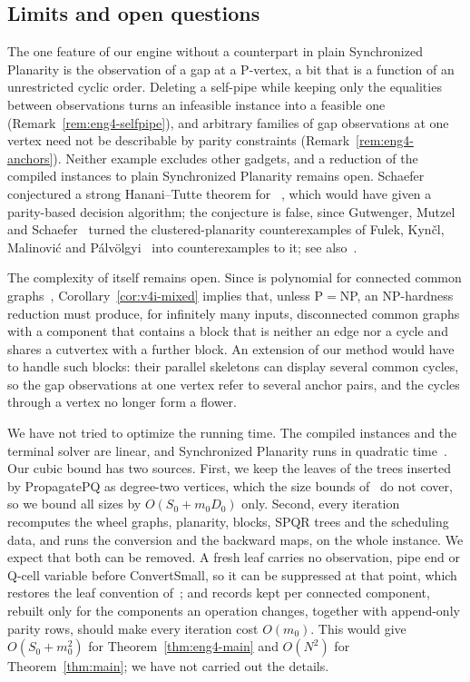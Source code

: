 \subsection{Limits and open questions}
The one feature of our engine without a counterpart in plain Synchronized
Planarity is the observation of a gap at a P-vertex, a bit that is a
function of an unrestricted cyclic order. Deleting a self-pipe while keeping
only the equalities between observations turns an infeasible instance into
a feasible one (Remark~\ref{rem:eng4-selfpipe}), and arbitrary families of
gap observations at one vertex need not be describable by parity
constraints (Remark~\ref{rem:eng4-anchors}). Neither example excludes other
gadgets, and a reduction of the compiled instances to plain Synchronized
Planarity remains open. Schaefer conjectured a strong Hanani--Tutte
theorem for \sefe{}~\cite[Conjecture~6.20]{Sch13}, which would have given a
parity-based decision algorithm; the conjecture is false, since Gutwenger,
Mutzel and Schaefer~\cite{GMS14} turned the clustered-planarity
counterexamples of Fulek, Kyn\v{c}l, Malinovi\'c and
P\'alv\"olgyi~\cite[p.~6]{FKMP15} into counterexamples to it; see
also~\cite[p.~137]{FPS17}.

The complexity of \sefe{} itself remains open. Since \sefe{} is polynomial
for connected common graphs~\cite{BFR21}, Corollary~\ref{cor:v4i-mixed}
implies that, unless P${}={}$NP, an NP-hardness reduction must produce, for
infinitely many inputs, disconnected common graphs with a component that
contains a block that is neither an edge nor a cycle and shares a cutvertex
with a further block. An
extension of our method would have to handle such blocks: their parallel
skeletons can display several common cycles, so the gap observations at
one vertex refer to several anchor pairs, and the cycles through a vertex
no longer form a flower.

We have not tried to optimize the running time. The compiled instances and
the terminal solver are linear, and Synchronized Planarity runs in quadratic
time~\cite{BFR21}. Our cubic bound has two sources. First, we keep the
leaves of the trees inserted by PropagatePQ as degree-two vertices, which
the size bounds of~\cite[Lemma~10(ii),(iii) and Theorem~12]{BFR21} do not
cover, so we bound all sizes by $O(S_0+m_0D_0)$ only. Second, every
iteration recomputes the wheel graphs, planarity, blocks, SPQR trees and the
scheduling data, and runs the conversion and the backward maps, on the
whole instance. We expect that both can be removed. A fresh leaf carries no
observation, pipe end or Q-cell variable before ConvertSmall, so it can be
suppressed at that point, which restores the leaf convention
of~\cite{BFR21}; and records kept per connected component, rebuilt only for
the components an operation changes, together with append-only parity rows,
should make every iteration cost $O(m_0)$. This would give $O(S_0+m_0^2)$
for Theorem~\ref{thm:eng4-main} and $O(N^2)$ for Theorem~\ref{thm:main}; we
have not carried out the details.
